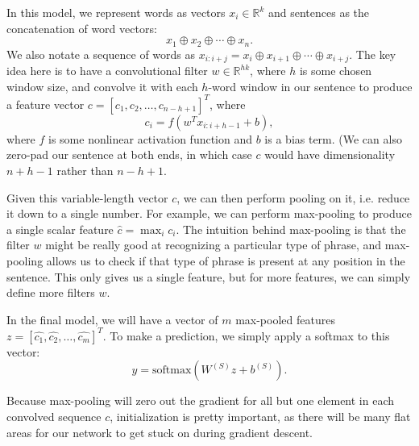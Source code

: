 In this model, we represent words as vectors $x_i \in \mathbb{R}^k$ and sentences as the concatenation of word vectors:
$$x_1 \oplus x_2 \oplus \cdots \oplus x_n.$$
We also notate a sequence of words as $x_{i:i+j} = x_i \oplus x_{i+1} \oplus \cdots \oplus x_{i+j}$. The key idea here is to have a convolutional filter $w \in \mathbb{R}^{hk}$, where $h$ is some chosen window size, and convolve it with each $h$-word window in our sentence to produce a feature vector $c = [c_1, c_2, \dots, c_{n-h+1}]^T$, where
$$c_i = f(w^Tx_{i:i+h-1} + b),$$
where $f$ is some nonlinear activation function and $b$ is a bias term. (We can also zero-pad our sentence at both ends, in which case $c$ would have dimensionality $n+h-1$ rather than $n-h+1$. 

Given this variable-length vector $c$, we can then perform pooling on it, i.e. reduce it down to a single number. For example, we can perform max-pooling to produce a single scalar feature $\hat{c} = \max_i c_i$. The intuition behind max-pooling is that the filter $w$ might be really good at recognizing a particular type of phrase, and max-pooling allows us to check if that type of phrase is present at any position in the sentence. This only gives us a single feature, but for more features, we can simply define more filters $w$.

In the final model, we will have a vector of $m$ max-pooled features $z = [\hat{c_1}, \hat{c_2}, \dots, \hat{c_m}]^T$. To make a prediction, we simply apply a softmax to this vector:
$$y = \text{softmax}\left(W^{(S)}z + b^{(S)}\right).$$

Because max-pooling will zero out the gradient for all but one element in each convolved sequence $c$, initialization is pretty important, as there will be many flat areas for our network to get stuck on during gradient descent.

